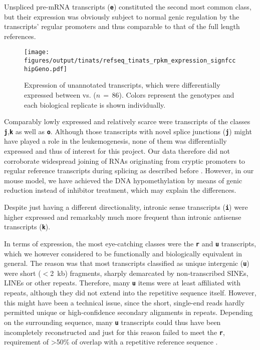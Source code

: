 Unspliced pre-mRNA transcripts (\textbf{\texttt{e}}) constituted the second most common class, but their expression was obviously subject to normal genic regulation by the transcripts' regular promoters and thus comparable to that of the full length references. 

\begin{figure}[!ht]
	\centering
	\texttt{[image: figures/output/tinats/refseq\_tinats\_rpkm\_expression\_signfcchipGeno.pdf]} 
	\caption{Expression of unannotated transcripts, which were differentially expressed between \dnmtchip vs. \dnmtwt ($n\,=\,86$). Colors represent the genotypes and each biological replicate is shown individually.}
	\label{fig:refseq_tinats_rpkm_expression_signfcchipGeno}
\end{figure}

Comparably lowly expressed and relatively scarce were transcripts of the classes \textbf{\texttt{j}},\textbf{\texttt{k}} as well as \textbf{\texttt{o}}. Although those transcripts with novel splice junctions (\textbf{\texttt{j}}) might have played a role in the leukemogenesis, none of them was differentially expressed and thus of interest for this project. Our data therefore did not corroborate widespread joining of RNAs originating from cryptic promoters to regular reference transcripts during splicing as described before \cite{Brocks2017}.
However, in our mouse model, we have achieved the DNA hypomethylation by means of genic  reduction instead of inhibitor treatment, which may explain the differences.

Despite just having a different directionality, intronic sense transcripts (\textbf{\texttt{i}}) were higher expressed and remarkably much more frequent than intronic antisense transcripts (\textbf{\texttt{k}}). 

In terms of expression, the most eye-catching classes were the \textbf{\texttt{r}} and \textbf{\texttt{u}} transcripts, which we however considered to be functionally and biologically equivalent in general. The reason was that most transcripts classified as unique intergenic (\textbf{\texttt{u}}) were short ($<$\SI{2}{\kilo b}) fragments, sharply demarcated by non-transcribed SINEs, LINEs or other repeats. Therefore, many \textbf{\texttt{u}} items were at least affiliated with repeats, although they did not extend into the repetitive sequence itself. However, this might have been a technical issue, since the short, single-end reads hardly permitted unique or high-confidence secondary alignments in repeats. Depending on the surrounding sequence, many \textbf{\texttt{u}} transcripts could thus have been incompletely reconstructed and just for this reason failed to meet the \textbf{\texttt{r}}, requirement of >50\% of overlap with a repetitive reference sequence . 

